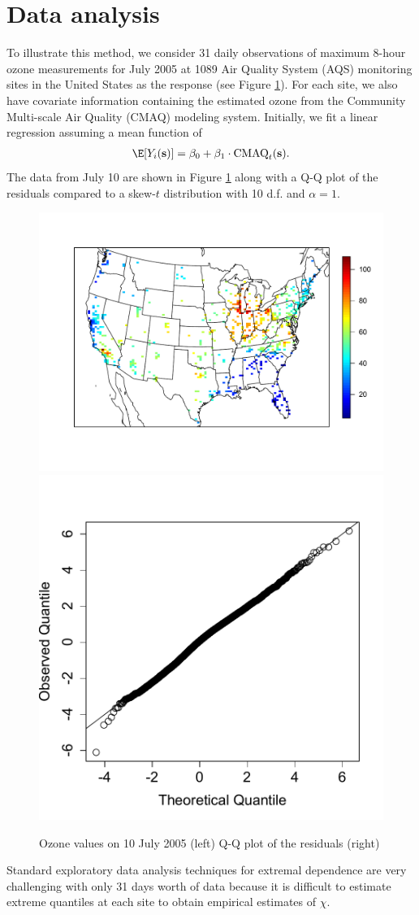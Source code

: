 \documentclass[11pt]{article}
\begin{document}
\section{Data analysis}\label{s:analysis}
To illustrate this method, we consider 31 daily observations of maximum 8-hour ozone measurements for July 2005 at 1089 Air Quality System (AQS) monitoring sites in the United States as the response (see Figure \ref{fig:ozone}).
For each site, we also have covariate information containing the estimated ozone from the Community Multi-scale Air Quality (CMAQ) modeling system.
Initially, we fit a linear regression assuming a mean function of
\begin{align}
  \E[Y_i(\bs)] = \beta_0 + \beta_1 \cdot \text{CMAQ}_t(\bs). \label{eq:datamean}
\end{align}
The data from July 10 are shown in Figure \ref{fig:ozone} along with a Q-Q plot of the residuals compared to a skew-$t$ distribution with 10 d.f. and $\alpha = 1$.
\begin{figure}
  \centering
  \includegraphics[width=0.56\linewidth]{plots/ozone-10jul-us.pdf}
  \includegraphics[width=0.41\linewidth]{plots/qq-res.pdf}
  \caption{Ozone values on 10 July 2005 (left) Q-Q plot of the residuals (right)}
  \label{fig:ozone}
\end{figure}
Standard exploratory data analysis techniques for extremal dependence are very challenging with only 31 days worth of data because it is difficult to estimate extreme quantiles at each site to obtain empirical estimates of $\chi$.
\end{document}
